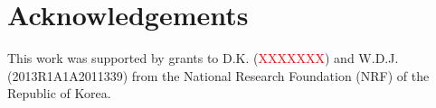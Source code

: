 \section*{Acknowledgements}

This work was supported by grants to D.K. (\textcolor{red}{XXXXXXX}) and W.D.J. (2013R1A1A2011339) from the National Research Foundation (NRF) of the Republic of Korea.